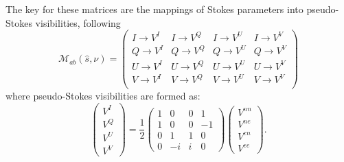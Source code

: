 \documentclass[twocolumn, trackchanges]{aastex61}
\begin{document}
The key for these matrices are the mappings of Stokes parameters into
pseudo-Stokes visibilities, following
\begin{equation}
\mathcal{M}_{ab}(\hat{s},\nu) =
\begin{pmatrix}
I \rightarrow V^I & I \rightarrow V^Q & I \rightarrow V^U & I \rightarrow V^V\\
Q \rightarrow V^I  & Q \rightarrow V^Q & Q \rightarrow V^U & Q \rightarrow V^V\\
U \rightarrow V^I  & U \rightarrow V^Q & U \rightarrow V^U & U \rightarrow V^V\\
V \rightarrow V^I  & V \rightarrow V^Q & V \rightarrow V^U & V \rightarrow V^V\\
\end{pmatrix}
\label{eq:Mab}
\end{equation}
where pseudo-Stokes visibilities are formed as:
\begin{equation}
\left(\begin{array}{c}
V^{I}\\
V^{Q}\\
V^{U}\\
V^{V}\end{array} \right)
= \frac{1}{2}
\left( \begin{array}{cccc}
1 & 0 & 0 & 1 \\
1 & 0 & 0 & -1 \\
0 & 1 & 1 & 0 \\
0 & -i & i & 0 \end{array} \right) 
\left(\begin{array}{c}
V^{nn}\\
V^{ne}\\
V^{en}\\
V^{ee}\end{array} \right) .
\label{eq:pseudo-stokes}
\end{equation}
\end{document}
